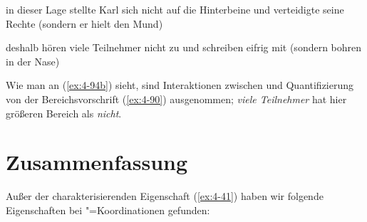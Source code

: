 \documentclass[output=paper]{langsci/langscibook}
\begin{document}
\begin{exe}
\ex
\label{ex:4-94}
\begin{xlist}
\ex%
\label{ex:4-94a}
in dieser Lage stellte Karl sich nicht auf die Hinterbeine und verteidigte seine Rechte (sondern er hielt den Mund)

\ex%
\label{ex:4-94b}
deshalb hören viele Teilnehmer nicht zu und schreiben eifrig mit (sondern bohren in der Nase)
\end{xlist}
\end{exe}
Wie man an (\ref{ex:4-94b}) sieht, sind Interaktionen zwischen  und Quantifizierung von der Bereichsvorschrift (\ref{ex:4-90}) ausgenommen; \textit{viele Teilnehmer} hat hier größeren Bereich als \textit{nicht}.

\section{Zusammenfassung}%
\label{sec:4-4}

\addlines
Außer der charakterisierenden Eigenschaft (\ref{ex:4-41}) haben wir folgende Eigenschaften bei "=Koordinationen gefunden:
\end{document}
